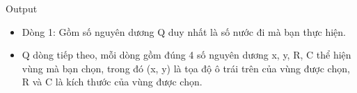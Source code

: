 Output
\begin{itemize}
	\item     Dòng 1: Gồm số nguyên dương Q duy nhất là số nước đi mà bạn thực hiện.   
	\item     Q dòng tiếp theo, mỗi dòng gồm đúng 4 số nguyên dương x, y, R, C thể hiện vùng mà bạn chọn, trong đó (x, y) là tọa độ ô trái trên của vùng được chọn, R và C là kích thước của vùng được chọn.   
\end{itemize}